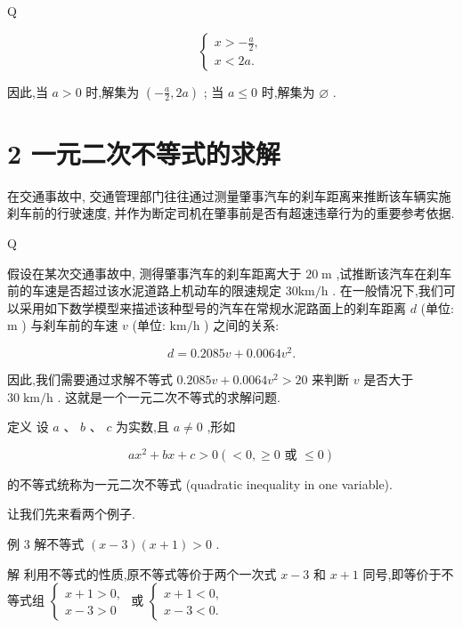 \documentclass[10pt]{article}
\begin{document}
Q

\[
\left\{  \begin{array}{l} x >  - \frac{a}{2}, \\  x < {2a}. \end{array}\right.
\]

因此,当 \(a > 0\) 时,解集为 \(\left( {-\frac{a}{2},{2a}}\right)\) ; 当 \(a \leq  0\) 时,解集为 \(\varnothing\) .

\section*{2 一元二次不等式的求解}

在交通事故中, 交通管理部门往往通过测量肇事汽车的刹车距离来推断该车辆实施刹车前的行驶速度, 并作为断定司机在肇事前是否有超速违章行为的重要参考依据.

Q

假设在某次交通事故中, 测得肇事汽车的刹车距离大于 \({20}\mathrm{\;m}\) ,试推断该汽车在刹车前的车速是否超过该水泥道路上机动车的限速规定 \({30}\mathrm{{km}}/\mathrm{h}\) . 在一般情况下,我们可以采用如下数学模型来描述该种型号的汽车在常规水泥路面上的刹车距离 \(d\) (单位: \(\mathrm{m}\) ) 与刹车前的车速 \(v\) (单位: \(\mathrm{{km}}/\mathrm{h}\) ) 之间的关系:

\[
d = {0.2085v} + {0.0064}{v}^{2}.
\]

因此,我们需要通过求解不等式 \({0.2085v} + {0.0064}{v}^{2} > {20}\) 来判断 \(v\) 是否大于 \({30}\mathrm{\;{km}}/\mathrm{h}\) . 这就是一个一元二次不等式的求解问题.

定义 设 \(a\text{ 、 }b\text{ 、 }c\) 为实数,且 \(a \neq  0\) ,形如

\[
a{x}^{2} + {bx} + c > 0\left( { < 0, \geq  0\text{ 或 } \leq  0}\right)
\]

的不等式统称为一元二次不等式 (quadratic inequality in one variable).

让我们先来看两个例子.

例 3 解不等式 \(\left( {x - 3}\right) \left( {x + 1}\right)  > 0\) .

解 利用不等式的性质,原不等式等价于两个一次式 \(x - 3\) 和 \(x + 1\) 同号,即等价于不等式组 \(\left\{  \begin{array}{l} x + 1 > 0, \\  x - 3 > 0 \end{array}\right.\) 或 \(\left\{  \begin{array}{l} x + 1 < 0, \\  x - 3 < 0. \end{array}\right.\)
\end{document}

